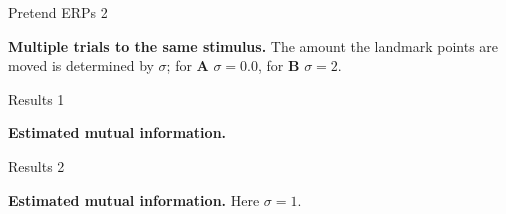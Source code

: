 \documentclass{beamer}
\begin{document}
\begin{frame}{Pretend ERPs 2}
\color{reddish}
\begin{center}

\end{center}
\color{black} \textbf{Multiple trials to the same stimulus.} The
amount the landmark points are moved is determined by $\sigma$; for
\textbf{A} $\sigma=0.0$, for \textbf{B} $\sigma=2$.  \color{black}
\end{frame}



\begin{frame}{Results 1}
\color{reddish}
\begin{center}

\color{black} \textbf{Estimated mutual information.} \color{black}
\end{center}
\end{frame}


\begin{frame}{Results 2}
\color{reddish}
\begin{center}
  
\color{black} \textbf{Estimated mutual information.} Here $\sigma=1$. \color{black}
\end{center}
\end{frame}


\end{document}
